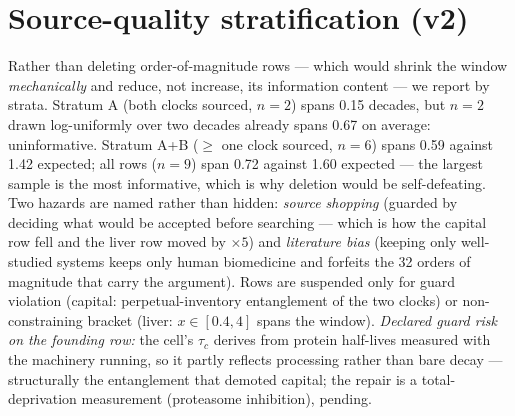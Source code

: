 \documentclass[11pt]{article}
\begin{document}
\section{Source-quality stratification (v2)}
Rather than deleting order-of-magnitude rows --- which would shrink the window \emph{mechanically}
and reduce, not increase, its information content --- we report by strata. Stratum A (both clocks
sourced, $n=2$) spans 0.15 decades, but $n=2$ drawn log-uniformly over two decades already spans
0.67 on average: uninformative. Stratum A+B ($\ge$ one clock sourced, $n=6$) spans 0.59 against
1.42 expected; all rows ($n=9$) span 0.72 against 1.60 expected --- the largest sample is the most
informative, which is why deletion would be self-defeating. Two hazards are named rather than
hidden: \emph{source shopping} (guarded by deciding what would be accepted before searching ---
which is how the capital row fell and the liver row moved by $\times 5$) and \emph{literature bias}
(keeping only well-studied systems keeps only human biomedicine and forfeits the 32 orders of
magnitude that carry the argument). Rows are suspended only for guard violation (capital:
perpetual-inventory entanglement of the two clocks) or non-constraining bracket (liver:
$x \in [0.4, 4]$ spans the window). \emph{Declared guard risk on the founding row:} the cell's
$\tau_c$ derives from protein half-lives measured with the machinery running, so it partly reflects
processing rather than bare decay --- structurally the entanglement that demoted capital; the repair
is a total-deprivation measurement (proteasome inhibition), pending.
\end{document}
